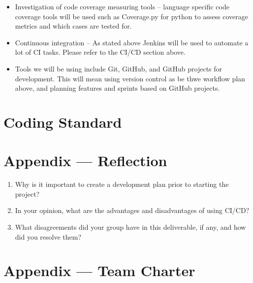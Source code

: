 \documentclass{article}
\begin{document}
\begin{itemize}
  \item Investigation of code coverage measuring tools -- language specific code coverage tools will be used such as Coverage.py for python to assess coverage metrics and which cases are tested for.
  \item Continuous integration -- As stated above Jenkins will be used to automate a lot of CI tasks. Please refer to the CI/CD section above.

  \item Tools we will be using include Git, GitHub, and GitHub projects for development. This will mean using version control as be thwe workflow plan above, and planning features and sprints based on GitHub projects. 
\end{itemize}



\section{Coding Standard}


\newpage{}

\section*{Appendix --- Reflection}




\begin{enumerate}
    \item Why is it important to create a development plan prior to starting the
    project?
    \item In your opinion, what are the advantages and disadvantages of using
    CI/CD?
    \item What disagreements did your group have in this deliverable, if any,
    and how did you resolve them?
\end{enumerate}

\newpage{}

\section*{Appendix --- Team Charter}

\end{document}
